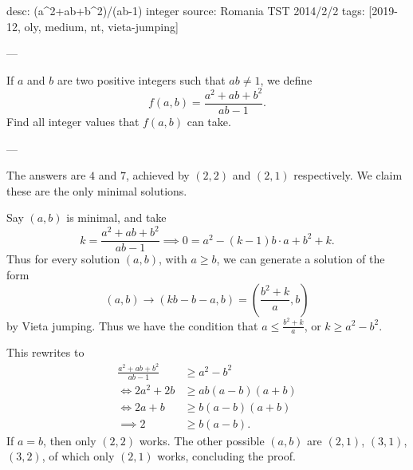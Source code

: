 desc: (a^2+ab+b^2)/(ab-1) integer
source: Romania TST 2014/2/2
tags: [2019-12, oly, medium, nt, vieta-jumping]

---

If $a$ and $b$ are two positive integers such that $ab\ne1$, we define \[f(a,b)=\frac{a^2+ab+b^2}{ab-1}.\]
Find all integer values that $f(a,b)$ can take.

---

The answers are $4$ and $7$, achieved by $(2,2)$ and $(2,1)$ respectively. We claim these are the only minimal solutions.

Say $(a,b)$ is minimal, and take \[k=\frac{a^2+ab+b^2}{ab-1}\implies0=a^2-(k-1)b\cdot a+b^2+k.\]
Thus for every solution $(a,b)$, with $a\ge b$, we can generate a solution of the form \[(a,b)\to(kb-b-a,b)=\left(\frac{b^2+k}a,b\right)\]
by Vieta jumping. Thus we have the condition that $a\le\frac{b^2+k}a$, or $k\ge a^2-b^2$.

This rewrites to
\begin{align*}
    \frac{a^2+ab+b^2}{ab-1}&\ge a^2-b^2\\
    \iff2a^2+2b&\ge ab(a-b)(a+b)\\
    \iff2a+b&\ge b(a-b)(a+b)\\
    \implies2&\ge b(a-b).
\end{align*}
If $a=b$, then only $(2,2)$ works. The other possible $(a,b)$ are $(2,1)$, $(3,1)$, $(3,2)$, of which only $(2,1)$ works, concluding the proof.
